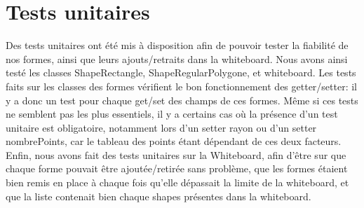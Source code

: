 \chapter{Tests unitaires}


Des tests unitaires ont été mis à disposition afin de pouvoir
tester la fiabilité de nos formes, ainsi que leurs ajouts/retraits dans la whiteboard.
Nous avons ainsi testé les classes ShapeRectangle, ShapeRegularPolygone, et
whiteboard.\newline
Les tests faits sur les classes des formes vérifient le bon fonctionnement des
getter/setter: il y a donc un test pour chaque get/set des champs de ces formes.
Même si ces tests ne semblent pas les plus essentiels, il y a certains cas où la présence d'un test unitaire est obligatoire, notamment lors d'un setter rayon ou d'un setter nombrePoints, car le tableau des points étant dépendant de ces deux facteurs.\newline
Enfin, nous avons fait des tests unitaires sur la Whiteboard, afin d'être sur que chaque forme pouvait être ajoutée/retirée sans problème, que les formes étaient bien remis en place à chaque fois qu'elle dépassait la limite de la whiteboard, et que la liste contenait bien chaque shapes présentes dans la whiteboard.
